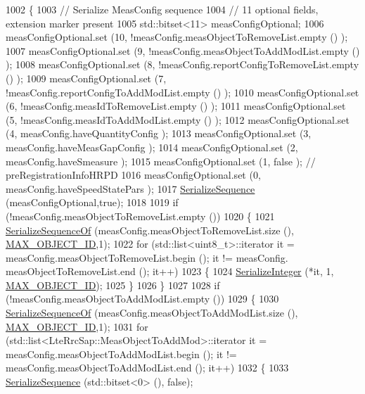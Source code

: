 \begin{DoxyCode}
1002 \{
1003   \textcolor{comment}{// Serialize MeasConfig sequence}
1004   \textcolor{comment}{// 11 optional fields, extension marker present}
1005   std::bitset<11> measConfigOptional;
1006   measConfigOptional.set (10, !measConfig.measObjectToRemoveList.empty () );
1007   measConfigOptional.set (9, !measConfig.measObjectToAddModList.empty () );
1008   measConfigOptional.set (8, !measConfig.reportConfigToRemoveList.empty () );
1009   measConfigOptional.set (7, !measConfig.reportConfigToAddModList.empty () );
1010   measConfigOptional.set (6, !measConfig.measIdToRemoveList.empty () );
1011   measConfigOptional.set (5, !measConfig.measIdToAddModList.empty () );
1012   measConfigOptional.set (4, measConfig.haveQuantityConfig ); 
1013   measConfigOptional.set (3, measConfig.haveMeasGapConfig ); 
1014   measConfigOptional.set (2, measConfig.haveSmeasure ); 
1015   measConfigOptional.set (1, \textcolor{keyword}{false} ); \textcolor{comment}{// preRegistrationInfoHRPD}
1016   measConfigOptional.set (0, measConfig.haveSpeedStatePars ); 
1017   \hyperlink{classns3_1_1Asn1Header_aa9744858380443ed95836fed08799aed}{SerializeSequence} (measConfigOptional,\textcolor{keyword}{true});
1018 
1019   \textcolor{keywordflow}{if} (!measConfig.measObjectToRemoveList.empty ())
1020     \{
1021       \hyperlink{classns3_1_1Asn1Header_a066b6dd077bde6b0c243f3eda2621277}{SerializeSequenceOf} (measConfig.measObjectToRemoveList.size (),
      \hyperlink{lte-rrc-header_8cc_ab2de695aee029784062779621283535d}{MAX\_OBJECT\_ID},1);
1022       \textcolor{keywordflow}{for} (std::list<uint8\_t>::iterator it = measConfig.measObjectToRemoveList.begin (); it != measConfig.
      measObjectToRemoveList.end (); it++)
1023         \{
1024           \hyperlink{classns3_1_1Asn1Header_ab1c3bd37730affa7473bc759d625c29a}{SerializeInteger} (*it, 1, \hyperlink{lte-rrc-header_8cc_ab2de695aee029784062779621283535d}{MAX\_OBJECT\_ID});
1025         \}
1026     \}
1027 
1028   \textcolor{keywordflow}{if} (!measConfig.measObjectToAddModList.empty ())
1029     \{
1030       \hyperlink{classns3_1_1Asn1Header_a066b6dd077bde6b0c243f3eda2621277}{SerializeSequenceOf} (measConfig.measObjectToAddModList.size (),
      \hyperlink{lte-rrc-header_8cc_ab2de695aee029784062779621283535d}{MAX\_OBJECT\_ID},1);
1031       \textcolor{keywordflow}{for} (std::list<LteRrcSap::MeasObjectToAddMod>::iterator it = measConfig.measObjectToAddModList.begin 
      (); it != measConfig.measObjectToAddModList.end (); it++)
1032         \{
1033           \hyperlink{classns3_1_1Asn1Header_aa9744858380443ed95836fed08799aed}{SerializeSequence} (std::bitset<0> (), \textcolor{keyword}{false});

\end{DoxyCode}
